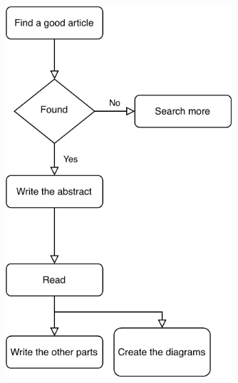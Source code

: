 \documentclass[10pt,twoside,english,a4paper]{article}
\begin{document}
\begin{figure}
\includegraphics[width=0.75\textwidth]{images/flowchart-crop.pdf}
\end{figure}





\end{document}
